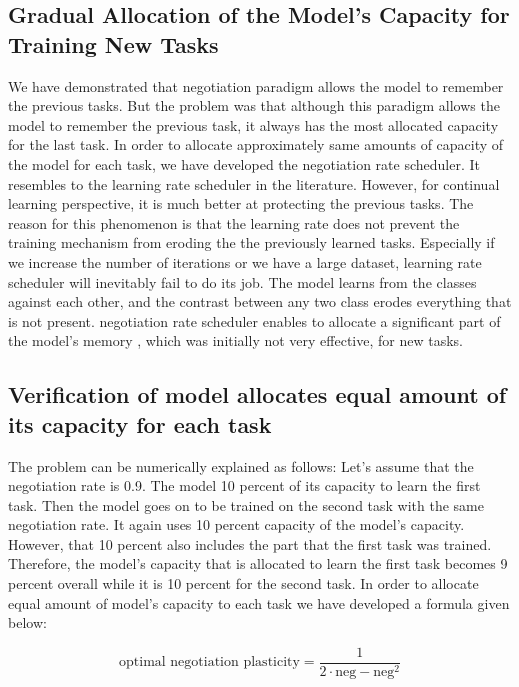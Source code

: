 \documentclass{article}
\begin{document}
\subsection{Gradual Allocation of the Model's Capacity for Training New Tasks}

We have demonstrated that negotiation paradigm allows the model to remember the previous tasks.
But the problem was that  although this paradigm allows the model to remember the previous task, it always has the most allocated capacity for the last task. In order to allocate approximately same amounts of capacity of the model for each task, we have developed the negotiation rate scheduler. It resembles to the learning rate scheduler in the literature. However, for continual learning perspective, it is much better at protecting the previous tasks.  The reason for this phenomenon is that the learning rate does not prevent the training mechanism from eroding the the previously learned tasks. Especially if we increase the number of iterations or we have a large dataset, learning rate scheduler will inevitably fail to do its job. The model learns from the classes against each other, and the contrast between any two class erodes everything that is not present. negotiation rate scheduler enables to allocate a significant part of the model's memory , which was initially not very effective, for new tasks.


\color{black}

\subsection{Verification of model allocates equal amount of its capacity for each task }


The problem can be numerically explained as follows: Let's assume that the negotiation rate is 0.9. The model 10 percent of its capacity to learn the first task. Then the model goes on to be trained on the second task with the same negotiation rate. It again uses 10 percent capacity of the model's capacity. However, that 10 percent also includes the part that the first task was trained. Therefore, the model's capacity that is allocated to learn the first task becomes 9 percent overall while it is 10 percent for the second task. 
In order to allocate equal amount of model's capacity to each task we have developed a formula given below:
 
\begin{equation}
    \text{optimal negotiation plasticity} = \frac{1}{{2 \cdot \text{neg} - \text{neg}^2}}
\end{equation}
\end{document}
